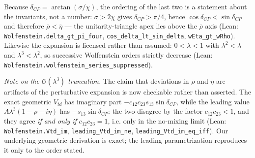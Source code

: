 Because $\delta_{CP}=\arctan(\sigma/\chi)$, the ordering of the last two is a
statement about the invariants, not a number: $\sigma>2\chi$ gives
$\delta_{CP}>\pi/4$, hence $\cos\delta_{CP}<\sin\delta_{CP}$ and therefore
$\bar\rho<\bar\eta$ --- the unitarity-triangle apex lies above the
$\bar\rho$ axis (Lean: \texttt{Wolfenstein.delta\_gt\_pi\_four},
\texttt{cos\_delta\_lt\_sin\_delta}, \texttt{wEta\_gt\_wRho}). Likewise the
expansion is licensed rather than assumed: $0<\lambda<1$ with
$\lambda^2<\lambda$ and $\lambda^3<\lambda^2$, so successive Wolfenstein orders
strictly decrease (Lean: \texttt{Wolfenstein.wolfenstein\_series\_suppressed}).

\textit{Note on the $\mathcal{O}(\lambda^3)$ truncation.} The claim that
deviations in $\bar\rho$ and $\bar\eta$ are artifacts of the perturbative
expansion is now checkable rather than asserted. The exact geometric $V_{td}$ has
imaginary part $-c_{12}c_{23}s_{13}\sin\delta_{CP}$, while the leading value
$A\lambda^3(1-\bar\rho-i\bar\eta)$ has $-s_{13}\sin\delta_{CP}$: the two
disagree by the factor $c_{12}c_{23}<1$, and they agree \emph{if and only if}
$c_{12}c_{23}=1$, i.e. only in the no-mixing limit
(Lean: \texttt{Wolfenstein.Vtd\_im}, \texttt{leading\_Vtd\_im\_ne},
\texttt{leading\_Vtd\_im\_eq\_iff}). Our underlying geometric derivation is
exact; the leading parametrization reproduces it only to the order stated.